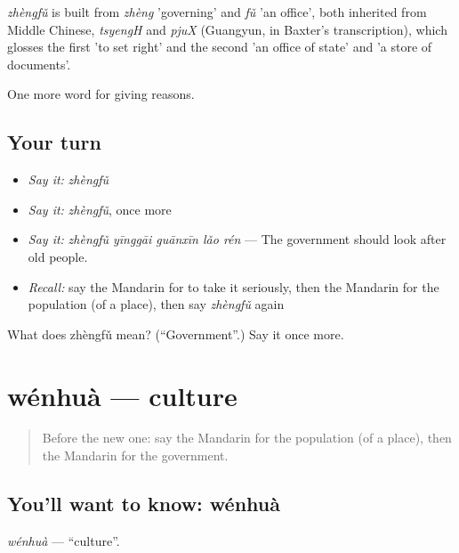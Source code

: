 \begin{cousinweb}
\emph{zhèngfǔ} is built from \emph{zhèng} 'governing' and \emph{fǔ} 'an office', both inherited from Middle Chinese, \emph{tsyengH} and \emph{pjuX} (Guangyun, in Baxter's transcription), which glosses the first 'to set right' and the second 'an office of state' and 'a store of documents'.
\end{cousinweb}

\begin{grammarlens}[title={What you've built}]
One more word for giving reasons.
\end{grammarlens}

\subsection*{Your turn}
\begin{itemize}
\raggedright
  \item \emph{Say it:} \emph{zhèngfǔ}
  \item \emph{Say it:} \emph{zhèngfǔ}, once more
  \item \emph{Say it:} \emph{zhèngfǔ yīnggāi guānxīn lǎo rén} — The government should look after old people.
  \item \emph{Recall:} say the Mandarin for to take it seriously, then the Mandarin for the population (of a place), then say \emph{zhèngfǔ} again
\end{itemize}

\begin{tcolorbox}[breakable,colback=teal!4,colframe=teal!35!black,title={Before you move on}]
What does zhèngfǔ mean? (\textquotedblleft{}Government\textquotedblright{}.) Say it once more.
\end{tcolorbox}
\section[wénhuà]{wénhuà — culture}

\label{lesson:ZH-C374-wenhua}



\begin{quote}
Before the new one: say the Mandarin for the population (of a place), then the Mandarin for the government.
\end{quote}

\subsection*{You'll want to know: wénhuà}
\emph{wénhuà} — \textquotedblleft{}culture\textquotedblright{}.

